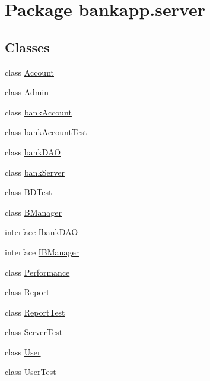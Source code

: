 \hypertarget{namespacebankapp_1_1server}{}\section{Package bankapp.\+server}
\label{namespacebankapp_1_1server}
\subsection*{Classes}
\begin{DoxyCompactItemize}
\item 
class \hyperlink{classbankapp_1_1server_1_1_account}{Account}
\item 
class \hyperlink{classbankapp_1_1server_1_1_admin}{Admin}
\item 
class \hyperlink{classbankapp_1_1server_1_1bank_account}{bank\+Account}
\item 
class \hyperlink{classbankapp_1_1server_1_1bank_account_test}{bank\+Account\+Test}
\item 
class \hyperlink{classbankapp_1_1server_1_1bank_d_a_o}{bank\+D\+AO}
\item 
class \hyperlink{classbankapp_1_1server_1_1bank_server}{bank\+Server}
\item 
class \hyperlink{classbankapp_1_1server_1_1_b_d_test}{B\+D\+Test}
\item 
class \hyperlink{classbankapp_1_1server_1_1_b_manager}{B\+Manager}
\item 
interface \hyperlink{interfacebankapp_1_1server_1_1_ibank_d_a_o}{Ibank\+D\+AO}
\item 
interface \hyperlink{interfacebankapp_1_1server_1_1_i_b_manager}{I\+B\+Manager}
\item 
class \hyperlink{classbankapp_1_1server_1_1_performance}{Performance}
\item 
class \hyperlink{classbankapp_1_1server_1_1_report}{Report}
\item 
class \hyperlink{classbankapp_1_1server_1_1_report_test}{Report\+Test}
\item 
class \hyperlink{classbankapp_1_1server_1_1_server_test}{Server\+Test}
\item 
class \hyperlink{classbankapp_1_1server_1_1_user}{User}
\item 
class \hyperlink{classbankapp_1_1server_1_1_user_test}{User\+Test}
\end{DoxyCompactItemize}
